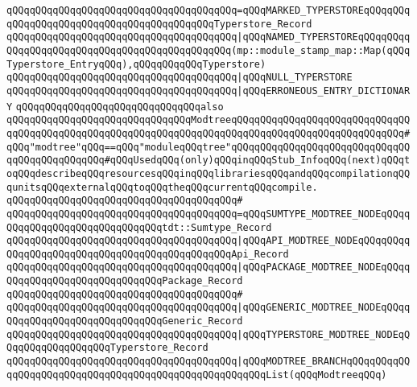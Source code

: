 \verb|qQQqqQQqqQQqqQQqqQQqqQQqqQQqqQQqqQQqqQQq=qQQqMARKED_TYPERSTOREqQQqqQQqqQQqqQQqqQQqqQQqqQQqqQQqqQQqqQQqqQQqTyperstore_Record|\newline
\verb|qQQqqQQqqQQqqQQqqQQqqQQqqQQqqQQqqQQqqQQq|\verb#|qQQqNAMED_TYPERSTOREqQQqqQQqqQQqqQQqqQQqqQQqqQQqqQQqqQQqqQQqqQQqqQQq(mp::module_stamp_map::Map(qQQqTyperstore_EntryqQQq),qQQqqQQqqQQqTyperstore)#\newline
\verb|qQQqqQQqqQQqqQQqqQQqqQQqqQQqqQQqqQQqqQQq|\verb#|qQQqNULL_TYPERSTORE#\newline
\verb|qQQqqQQqqQQqqQQqqQQqqQQqqQQqqQQqqQQqqQQq|\verb#|qQQqERRONEOUS_ENTRY_DICTIONARY#\newline
\newline
\newline
\newline
\verb|qQQqqQQqqQQqqQQqqQQqqQQqqQQqqQQqalso|\newline
\verb|qQQqqQQqqQQqqQQqqQQqqQQqqQQqqQQqModtreeqQQqqQQqqQQqqQQqqQQqqQQqqQQqqQQqqQQqqQQqqQQqqQQqqQQqqQQqqQQqqQQqqQQqqQQqqQQqqQQqqQQqqQQqqQQqqQQqqQQq#qQQq"modtree"qQQq==qQQq"moduleqQQqtree"qQQqqQQqqQQqqQQqqQQqqQQqqQQqqQQqqQQqqQQqqQQqqQQq#qQQqUsedqQQq(only)qQQqinqQQqStub_InfoqQQq(next)qQQqtoqQQqdescribeqQQqresourcesqQQqinqQQqlibrariesqQQqandqQQqcompilationqQQqunitsqQQqexternalqQQqtoqQQqtheqQQqcurrentqQQqcompile.|\newline
\verb|qQQqqQQqqQQqqQQqqQQqqQQqqQQqqQQqqQQqqQQq#|\newline
\verb|qQQqqQQqqQQqqQQqqQQqqQQqqQQqqQQqqQQqqQQq=qQQqSUMTYPE_MODTREE_NODEqQQqqQQqqQQqqQQqqQQqqQQqqQQqqQQqtdt::Sumtype_Record|\newline
\verb|qQQqqQQqqQQqqQQqqQQqqQQqqQQqqQQqqQQqqQQq|\verb#|qQQqAPI_MODTREE_NODEqQQqqQQqqQQqqQQqqQQqqQQqqQQqqQQqqQQqqQQqqQQqqQQqApi_Record#\newline
\verb|qQQqqQQqqQQqqQQqqQQqqQQqqQQqqQQqqQQqqQQq|\verb#|qQQqPACKAGE_MODTREE_NODEqQQqqQQqqQQqqQQqqQQqqQQqqQQqqQQqPackage_Record#\newline
\verb|qQQqqQQqqQQqqQQqqQQqqQQqqQQqqQQqqQQqqQQq#|\newline
\verb|qQQqqQQqqQQqqQQqqQQqqQQqqQQqqQQqqQQqqQQq|\verb#|qQQqGENERIC_MODTREE_NODEqQQqqQQqqQQqqQQqqQQqqQQqqQQqqQQqGeneric_Record#\newline
\verb|qQQqqQQqqQQqqQQqqQQqqQQqqQQqqQQqqQQqqQQq|\verb#|qQQqTYPERSTORE_MODTREE_NODEqQQqqQQqqQQqqQQqqQQqTyperstore_Record#\newline
\verb|qQQqqQQqqQQqqQQqqQQqqQQqqQQqqQQqqQQqqQQq|\verb#|qQQqMODTREE_BRANCHqQQqqQQqqQQqqQQqqQQqqQQqqQQqqQQqqQQqqQQqqQQqqQQqqQQqqQQqList(qQQqModtreeqQQq)#\newline
